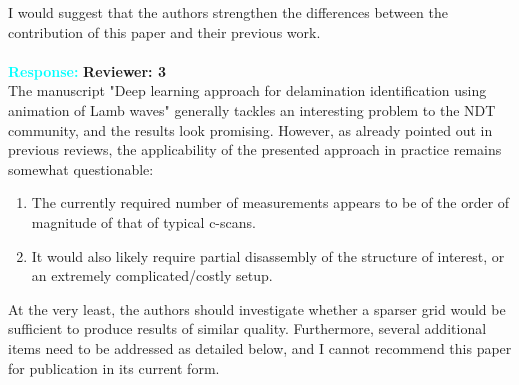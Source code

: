 \documentclass[11pt,a2paper]{report}
\begin{document}
	I would suggest that the authors strengthen the differences between the contribution of this paper and their previous work.
	\\ \\ 
	\textcolor{Cyan}{
		\textbf{Response:}}
	\newpage
	\textbf{Reviewer: 3} \\
	The manuscript "Deep learning approach for delamination identification using animation of Lamb waves" generally tackles an interesting problem to the NDT community, and the results look promising. 
	However, as already pointed out in previous reviews, the applicability of the presented approach in practice remains somewhat questionable: 
	\begin{enumerate}
		\item The currently required number of measurements appears to be of the order of magnitude of that of typical c-scans.
		\item It would also likely require partial disassembly of the structure of interest, or an extremely complicated/costly setup. 
	\end{enumerate}

	At the very least, the authors should investigate whether a sparser grid would be sufficient to produce results of similar quality. 
	Furthermore, several additional items need to be addressed as detailed below, and I cannot recommend this paper for publication in its current form.
	
\end{document}
